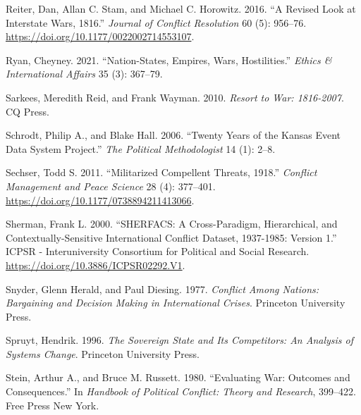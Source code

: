 \documentclass{article}
\newlength{\cslhangindent}
\newlength{\cslentryspacingunit} %
\newenvironment{CSLReferences}[2] %
 {%
  \setlength{\parindent}{0pt}
  \ifodd #1
  \let\oldpar\par
  \def\par{\hangindent=\cslhangindent\oldpar}
  \fi
  \setlength{\parskip}{#2\cslentryspacingunit}
 }%
 {}
\begin{document}
\begin{CSLReferences}{1}{0}
\leavevmode{}%
Reiter, Dan, Allan C. Stam, and Michael C. Horowitz. 2016. {``A {Revised
Look} at {Interstate Wars}, 1816.''} \emph{Journal of
Conflict Resolution} 60 (5): 956--76.
\url{https://doi.org/10.1177/0022002714553107}.

\leavevmode{}%
Ryan, Cheyney. 2021. {``Nation-{States}, {Empires}, {Wars},
{Hostilities}.''} \emph{Ethics \& International Affairs} 35 (3):
367--79.

\leavevmode{}%
Sarkees, Meredith Reid, and Frank Wayman. 2010. \emph{Resort to War:
1816-2007}. {CQ Press}.

\leavevmode{}%
Schrodt, Philip A., and Blake Hall. 2006. {``Twenty Years of the
{Kansas} Event Data System Project.''} \emph{The Political
Methodologist} 14 (1): 2--8.

\leavevmode{}%
Sechser, Todd S. 2011. {``Militarized {Compellent Threats},
1918.''} \emph{Conflict Management and Peace Science} 28
(4): 377--401. \url{https://doi.org/10.1177/0738894211413066}.

\leavevmode{}%
Sherman, Frank L. 2000. {``{SHERFACS}: {A Cross-Paradigm},
{Hierarchical}, and {Contextually-Sensitive International Conflict
Dataset}, 1937-1985: {Version} 1.''} {ICPSR - Interuniversity Consortium
for Political and Social Research}.
\url{https://doi.org/10.3886/ICPSR02292.V1}.

\leavevmode{}%
Snyder, Glenn Herald, and Paul Diesing. 1977. \emph{Conflict Among
Nations: {Bargaining} and Decision Making in International Crises}.
{Princeton University Press}.

\leavevmode{}%
Spruyt, Hendrik. 1996. \emph{The {Sovereign State} and {Its
Competitors}: {An Analysis} of {Systems Change}}. {Princeton University
Press}.

\leavevmode{}%
Stein, Arthur A., and Bruce M. Russett. 1980. {``Evaluating War:
{Outcomes} and Consequences.''} In \emph{Handbook of Political Conflict:
Theory and Research}, 399--422. {Free Press New York}.


\end{CSLReferences}
\end{document}
